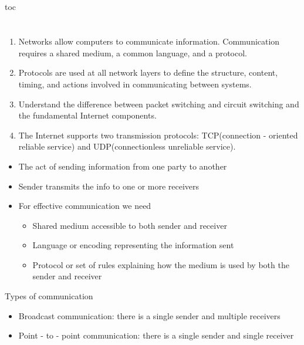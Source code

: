 \documentclass[12pt] {report}
\title{\Huge{}\\}
\author{\huge{}}
\date{}
\begin{document}
\pdfbookmark[section] {\contentsname} {toc}
\chapter{}
{
    \begin{enumerate}
    \item Networks allow computers to communicate information. Communication requires a shared medium, a common language, and a protocol.
    \item Protocols are used at all network layers to define the structure, content, timing, and actions involved in communicating between systems.
    \item Understand the difference between packet switching and circuit switching and the fundamental Internet components.
\item The Internet supports two transmission protocols:
    TCP(connection - oriented reliable service) and UDP(connectionless unreliable service).
    \end{enumerate}
}
{
    \begin{itemize}
    \item The act of sending information from one party to another
    \item Sender transmits the info to one or more receivers
    \item For effective communication we need
    \begin{itemize}
    \item Shared medium accessible to both sender and receiver
    \item Language or encoding representing the information sent
    \item Protocol or set of rules explaining how the medium is used by both the sender and receiver
    \end{itemize}
    \end{itemize}
    Types of communication
    \begin{itemize}
\item Broadcast communication:
    there is a single sender and multiple receivers
\item Point - to - point communication:
    there is a single sender and single receiver
    \end{itemize}
}
\end{document}
